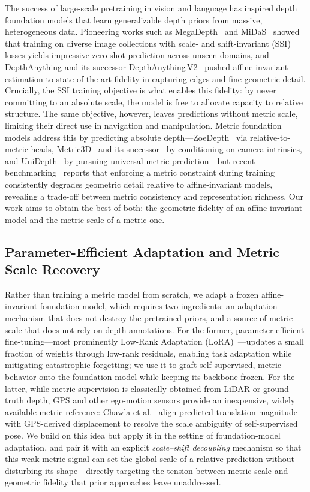 The success of large-scale pretraining in vision and language has inspired depth foundation models that learn generalizable depth priors from massive, heterogeneous data. Pioneering works such as MegaDepth~\cite{li2018megadepth} and MiDaS~\cite{ranftl2020towards} showed that training on diverse image collections with scale- and shift-invariant (SSI) losses yields impressive zero-shot prediction across unseen domains, and DepthAnything and its successor DepthAnything\,V2~\cite{yang2024depth} pushed affine-invariant estimation to state-of-the-art fidelity in capturing edges and fine geometric detail. Crucially, the SSI training objective is what enables this fidelity: by never committing to an absolute scale, the model is free to allocate capacity to relative structure. The same objective, however, leaves predictions without metric scale, limiting their direct use in navigation and manipulation. Metric foundation models address this by predicting absolute depth---ZoeDepth~\cite{bhat2023zoedepth} via relative-to-metric heads, Metric3D~\cite{yin2023metric3d} and its successor~\cite{liu2024metricdepth} by conditioning on camera intrinsics, and UniDepth~\cite{piccinelli2024unidepth} by pursuing universal metric prediction---but recent benchmarking~\cite{li2025benchdepth} reports that enforcing a metric constraint during training consistently degrades geometric detail relative to affine-invariant models, revealing a trade-off between metric consistency and representation richness. Our work aims to obtain the best of both: the geometric fidelity of an affine-invariant model and the metric scale of a metric one.

\subsection{Parameter-Efficient Adaptation and Metric Scale Recovery}

Rather than training a metric model from scratch, we adapt a frozen affine-invariant foundation model, which requires two ingredients: an adaptation mechanism that does not destroy the pretrained priors, and a source of metric scale that does not rely on depth annotations. For the former, parameter-efficient fine-tuning---most prominently Low-Rank Adaptation (LoRA)~\cite{hu2022lora}---updates a small fraction of weights through low-rank residuals, enabling task adaptation while mitigating catastrophic forgetting; we use it to graft self-supervised, metric behavior onto the foundation model while keeping its backbone frozen. For the latter, while metric supervision is classically obtained from LiDAR or ground-truth depth, GPS and other ego-motion sensors provide an inexpensive, widely available metric reference: Chawla et al.~\cite{chawla2021multimodal} align predicted translation magnitude with GPS-derived displacement to resolve the scale ambiguity of self-supervised pose. We build on this idea but apply it in the setting of foundation-model adaptation, and pair it with an explicit \emph{scale--shift decoupling} mechanism so that this weak metric signal can set the global scale of a relative prediction without disturbing its shape---directly targeting the tension between metric scale and geometric fidelity that prior approaches leave unaddressed.

